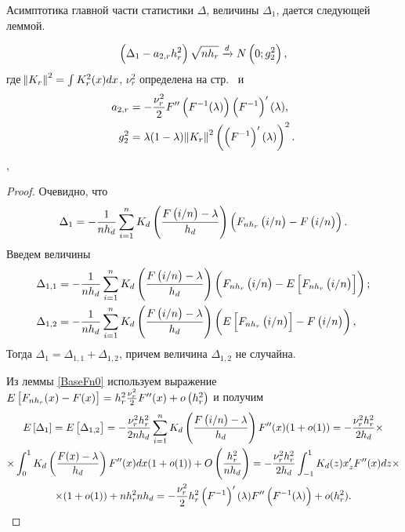 \documentclass[a4paper,14pt,russian]{article}
\begin{document}
 Асимптотика главной части статистики $\Delta$, величины $\Delta_{1}$, дается следующей леммой.
  \begin{lemma}\label{xla1Delta1}
  $$
  \left(\Delta_{1} -a_{2,r} h_r^2\right)\sqrt{n h_r} \xrightarrow{d} N\left(0;g_2^2\right),
  $$
  где $\norm{K_r}^2 = \int K_r^2(x)dx$, $\nu_r^2$ определена на стр.~\pageref{nu} и
\begin{align*}
   a_{2,r} &= -\frac{\nu_r^2}{2} F''\left(F^{-1}(\lambda)\right)\left(F^{-1}\right)'(\lambda),\\
 g_2^2 &= \lambda (1- \lambda) \norm{K_r}^2 \left(\left(F^{-1}\right)'(\lambda)\right)^2.
\end{align*}
,
\end{lemma}
\begin{proof}
 Очевидно, что
$$
\Delta_{1} = - \frac{1}{n h_d} \sum_{i =1}^n K_d\left(\frac{F\left(i/n\right)-\lambda}{h_d}\right)\left(F_{n h_r}\left(i/n\right)- F\left(i/n\right)\right).\\
$$
Введем величины
\begin{align*}
  \Delta_{1,1} &= - \frac{1}{n h_d} \sum_{i =1}^n K_d\left(\frac{F\left(i/n\right)-\lambda}{h_d}\right)\left(F_{n h_r}\left(i/n\right)- E\left[F_{n h_r}\left(i/n\right)\right]\right);\\
  \Delta_{1,2} &= - \frac{1}{n h_d} \sum_{i =1}^n K_d\left(\frac{F\left(i/n\right)-\lambda}{h_d}\right)\left(E\left[F_{n h_r}\left(i/n\right)\right]- F\left(i/n\right)\right),
\end{align*}
Тогда $\Delta_{1} =\Delta_{1,1} + \Delta_{1,2}$, причем величина $\Delta_{1,2}$ не случайна.

Из леммы \ref{BaseFn0} используем выражение $E\left[F_{n h_r}(x)-F(x)\right] = h_r^2 \frac{\nu_r^2}{2} F''(x)+ o\left(h_r^2\right)$ и получим
\begin{multline}\label{xla1EDelta1}
E\left[\Delta_{1}\right] = E\left[\Delta_{1,2}\right]=-\frac{\nu_r^2h_r^2}{2n h_d} \sum_{i =1}^n K_d\left(\frac{F\left(i/n\right)-\lambda}{h_d}\right)  F''(x)(1+o(1)) =-\frac{\nu_r^2h_r^2}{2h_d} \times \\ \times \int_{0}^{1} K_d\left(\frac{F(x)-\lambda}{h_d}\right) F''(x)dx(1 + o(1)) + O\left(\frac{h_r^2}{n h_d}\right) = -\frac{\nu_r^2h_r^2}{2h_d}\int_{-1}^{1}K_d(z) x'_z  F''(x) dz\times \\ \times(1+o(1)) +n{h_r^2}{n h_d} = -\frac{\nu_r^2}{2}h_r^2\left(F^{-1}\right)'(\lambda) F''\left(F^{-1}(\lambda)\right) + o(h_r^2).
\end{multline}


\end{proof}
\end{document}
